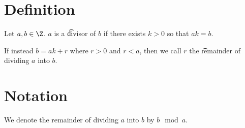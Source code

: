 

\section*{Definition}

Let $a, b \in \Z $.
$a$ is a \t{divisor} of $b$ if there exists $k > 0$ so that $ak = b$.

If instead $b = ak + r$ where $r > 0$ and $r < a$, then we call $r$ the \t{remainder} of dividing $a$ into $b$.

    \section*{Notation}


We denote the remainder of dividing $a$ into $b$ by $b \mod a$.

\blankpage

